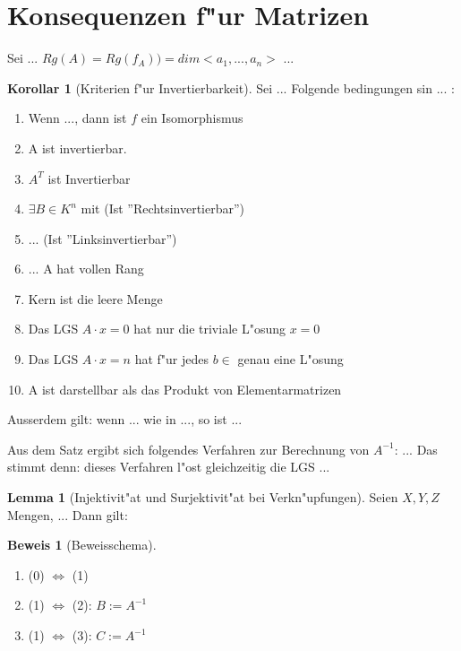 \documentclass[fontsize=11pt,paper=a4,BCOR=0mm,DIV=11,automark,headsepline]{scrbook}
\theoremstyle{remark}
\theoremstyle{definition}
\newtheorem{lemma}{Lemma}[section]
\newtheorem*{korollar}{Korollar}
\theoremstyle{proof}
\newtheorem*{prof}{Beweis}
\theoremstyle{remark}
\begin{document}
\section{Konsequenzen f"ur Matrizen}
\label{sec:konsma}

Sei ...
$Rg(A)=Rg(f_A))=dim<a_1,...,a_n>$ ...

\begin{korollar}[Kriterien f"ur Invertierbarkeit]
  Sei ... Folgende bedingungen sin ... :
  \begin{enumerate}
  \item Wenn ..., dann ist $f$ ein Isomorphismus
  \item A ist invertierbar.
  \item $A^T$ ist Invertierbar
  \item $\exists B\in K^n$ mit (Ist ''Rechtsinvertierbar'')
  \item ... (Ist ''Linksinvertierbar'')
  \item ... A hat vollen Rang
  \item Kern ist die leere Menge
  \item Das LGS $A\cdot x = 0$ hat nur die triviale L"osung $x=0$
  \item Das LGS $A\cdot x = n$ hat f"ur jedes $b\in $ genau eine L"osung
  \item A ist darstellbar als das Produkt von Elementarmatrizen
  \end{enumerate}

  Ausserdem gilt: wenn ... wie in ..., so ist ... 
\end{korollar}

Aus dem Satz ergibt sich folgendes Verfahren zur Berechnung von $A^{-1}$: ...
Das stimmt denn: dieses Verfahren l"ost gleichzeitig die LGS ...

\begin{lemma}[Injektivit"at und Surjektivit"at bei Verkn"upfungen]
  Seien $X,Y,Z$ Mengen, ... Dann gilt:  
\end{lemma}

\begin{prof}[Beweisschema]
  \begin{enumerate}
  \item (0) $ \iff $ (1)
  \item (1) $ \iff $ (2): $B:=A^{-1}$
  \item (1) $ \iff $ (3): $C:=A^{-1}$
  \end{enumerate}
\end{prof}
\end{document}
